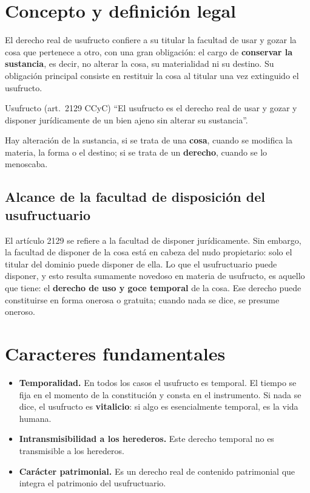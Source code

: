 \documentclass[12pt,oneside]{book}
\begin{document}
\section{Concepto y definición legal}

El derecho real de usufructo confiere a su titular la facultad de usar y gozar la cosa que pertenece a otro, con una gran obligación: el cargo de \textbf{conservar la sustancia}, es decir, no alterar la cosa, su materialidad ni su destino. Su obligación principal consiste en restituir la cosa al titular una vez extinguido el usufructo.

\begin{definicion}{Usufructo (art.~2129 CCyC)}
``El usufructo es el derecho real de usar y gozar y disponer jurídicamente de un bien ajeno sin alterar su sustancia''.
\end{definicion}

Hay alteración de la sustancia, si se trata de una \textbf{cosa}, cuando se modifica la materia, la forma o el destino; si se trata de un \textbf{derecho}, cuando se lo menoscaba.

\subsection{Alcance de la facultad de disposición del usufructuario}

El artículo 2129 se refiere a la facultad de disponer jurídicamente. Sin embargo, la facultad de disponer de la cosa está en cabeza del nudo propietario: solo el titular del dominio puede disponer de ella. Lo que el usufructuario puede disponer, y esto resulta sumamente novedoso en materia de usufructo, es aquello que tiene: el \textbf{derecho de uso y goce temporal} de la cosa. Ese derecho puede constituirse en forma onerosa o gratuita; cuando nada se dice, se presume oneroso.

\section{Caracteres fundamentales}

\begin{itemize}
    \item \textbf{Temporalidad.} En todos los casos el usufructo es temporal. El tiempo se fija en el momento de la constitución y consta en el instrumento. Si nada se dice, el usufructo es \textbf{vitalicio}: si algo es esencialmente temporal, es la vida humana.
    \item \textbf{Intransmisibilidad a los herederos.} Este derecho temporal no es transmisible a los herederos.
    \item \textbf{Carácter patrimonial.} Es un derecho real de contenido patrimonial que integra el patrimonio del usufructuario.
\end{itemize}
\end{document}
